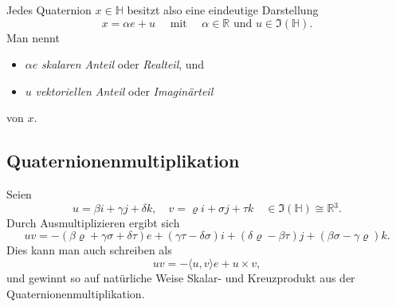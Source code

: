 \documentclass[aspectratio=169]{beamer}
\newcommand{\Ham}{\ensuremath{\mathbb{H}}{ }}
\newcommand{\R}{\ensuremath{\mathbb{R}}{ }}
\begin{document}
    \begin{frame}
        Jedes Quaternion \(x \in \Ham\) besitzt also eine eindeutige Darstellung
        \[
            x = \alpha e + u \quad \text { mit } \quad \alpha \in \R \text{ und } u \in \Im(\Ham)
        .\]
        Man nennt
        \begin{itemize}
            \item 
                \(\alpha e\) \emph{skalaren Anteil} oder \emph{Realteil}, und 

            \item
                \(u\) \emph{vektoriellen Anteil} oder \emph{Imaginärteil}
        \end{itemize}
        von \(x\).

    \end{frame}

    \subsection{Quaternionenmultiplikation}

    \begin{frame}
        Seien
        \[
            u = \beta i + \gamma j + \delta k,
            \quad v = \varrho i + \sigma j + \tau k
            \quad \in \Im(\Ham) \cong \R^3
        .\]
        Durch Ausmultiplizieren ergibt sich
        \[
            uv = - (\beta \varrho + \gamma \sigma + \delta \tau) e + (\gamma \tau - \delta \sigma) i + (\delta \varrho - \beta \tau) j + (\beta \sigma - \gamma \varrho) k
        .\]
        Dies kann man auch schreiben als
        \[
            uv = - \langle u, v \rangle e + u \times v
        ,\] 
        und gewinnt so auf natürliche Weise Skalar- und Kreuzprodukt aus der Quaternionenmultiplikation.
    \end{frame}
\end{document}

